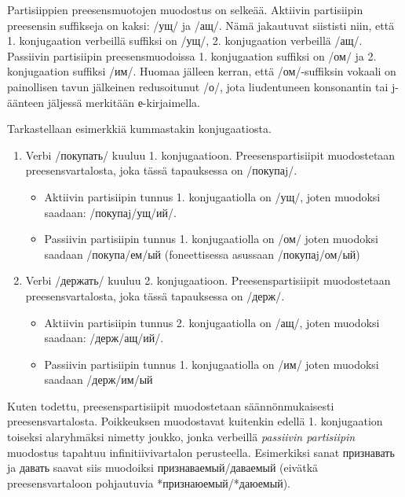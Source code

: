 \documentclass[]{scrreprt}
\providecommand{\tightlist}{%
  \setlength{\itemsep}{0pt}\setlength{\parskip}{0pt}}
\begin{document}
Partisiippien preesensmuotojen muodostus on selkeää. Aktiivin
partisiipin preesensin suffikseja on kaksi: /ущ/ ja /ащ/. Nämä
jakautuvat siististi niin, että 1. konjugaation verbeillä suffiksi on
/ущ/, 2. konjugaation verbeillä /ащ/. Passiivin partisiipin
preesensmuodoissa 1. konjugaation suffiksi on /ом/ ja 2. konjugaation
suffiksi /им/. Huomaa jälleen kerran, että /ом/-suffiksin vokaali on
painollisen tavun jälkeinen redusoitunut /о/, jota liudentuneen
konsonantin tai j-äänteen jäljessä merkitään е-kirjaimella.

Tarkastellaan esimerkkiä kummastakin konjugaatiosta.

\begin{enumerate}
\def\labelenumi{\alph{enumi})}
\tightlist
\item
  Verbi /покупать/ kuuluu 1. konjugaatioon. Preesenspartisiipit
  muodostetaan preesensvartalosta, joka tässä tapauksessa on /покупаj/.

  \begin{itemize}
  \tightlist
  \item
    Aktiivin partisiipin tunnus 1. konjugaatiolla on /ущ/, joten
    muodoksi saadaan: /покупаj/ущ/ий/.
  \item
    Passiivin partisiipin tunnus 1. konjugaatiolla on /ом/ joten
    muodoksi saadaan /покупа/ем/ый (foneettisessa asussaan
    /покупаj/ом/ый)
  \end{itemize}
\item
  Verbi /держать/ kuuluu 2. konjugaatioon. Preesenspartisiipit
  muodostetaan preesensvartalosta, joka tässä tapauksessa on /держ/.

  \begin{itemize}
  \tightlist
  \item
    Aktiivin partisiipin tunnus 2. konjugaatiolla on /ащ/, joten
    muodoksi saadaan: /держ/ащ/ий/.
  \item
    Passiivin partisiipin tunnus 1. konjugaatiolla on /им/ joten
    muodoksi saadaan /держ/им/ый
  \end{itemize}
\end{enumerate}

Kuten todettu, preesenspartisiipit muodostetaan säännönmukaisesti
preesensvartalosta. Poikkeuksen muodostavat kuitenkin edellä 1.
konjugaation toiseksi alaryhmäksi nimetty joukko, jonka verbeillä
\emph{passiivin partisiipin} muodostus tapahtuu infinitiivivartalon
perusteella. Esimerkiksi sanat признавать ja давать saavat siis
muodoiksi признаваемый/даваемый (eivätkä preesensvartaloon pohjautuvia
*признаюемый/*даюемый).
\end{document}
